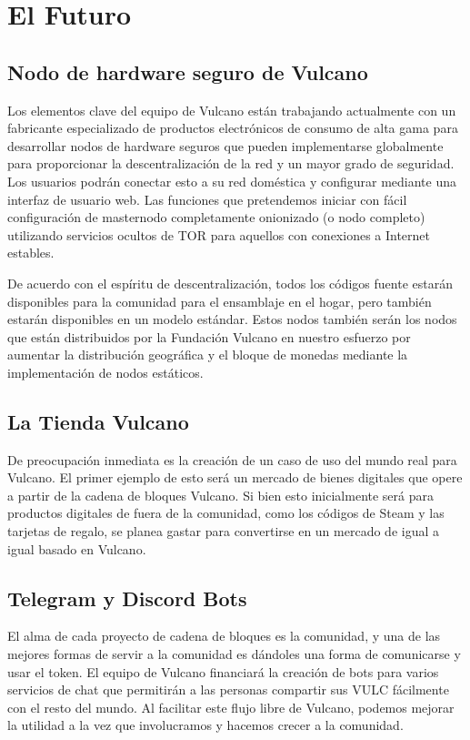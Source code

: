 \documentclass[A4paper, 12pt]{article}
\begin{document}
\section{El Futuro}
\subsection{Nodo de hardware seguro de Vulcano}
Los elementos clave del equipo de Vulcano están trabajando actualmente con un fabricante especializado de productos electrónicos de consumo de alta gama para desarrollar nodos de hardware seguros que pueden implementarse globalmente para proporcionar la descentralización de la red y un mayor grado de seguridad. Los usuarios podrán conectar esto a su red doméstica y configurar mediante una interfaz de usuario web. Las funciones que pretendemos iniciar con fácil configuración de masternodo completamente onionizado (o nodo completo) utilizando servicios ocultos de TOR para aquellos con conexiones a Internet estables.

De acuerdo con el espíritu de descentralización, todos los códigos fuente estarán disponibles para la comunidad para el ensamblaje en el hogar, pero también estarán disponibles en un modelo estándar.  Estos nodos también serán los nodos que están distribuidos por la Fundación Vulcano en nuestro esfuerzo por aumentar la distribución geográfica y el bloque de monedas mediante la implementación de nodos estáticos.

\subsection{La Tienda Vulcano}
De preocupación inmediata es la creación de un caso de uso del mundo real para Vulcano. El primer ejemplo de esto será un mercado de bienes digitales que opere a partir de la cadena de bloques Vulcano. Si bien esto inicialmente será para productos digitales de fuera de la comunidad, como los códigos de Steam y las tarjetas de regalo, se planea gastar para convertirse en un mercado de igual a igual basado en Vulcano.

\subsection{Telegram y Discord Bots}
El alma de cada proyecto de cadena de bloques es la comunidad, y una de las mejores formas de servir a la comunidad es dándoles una forma de comunicarse y usar el token. El equipo de Vulcano financiará la creación de bots para varios servicios de chat que permitirán a las personas compartir sus VULC fácilmente con el resto del mundo. Al facilitar este flujo libre de Vulcano, podemos mejorar la utilidad a la vez que involucramos y hacemos crecer a la comunidad.
\end{document}
